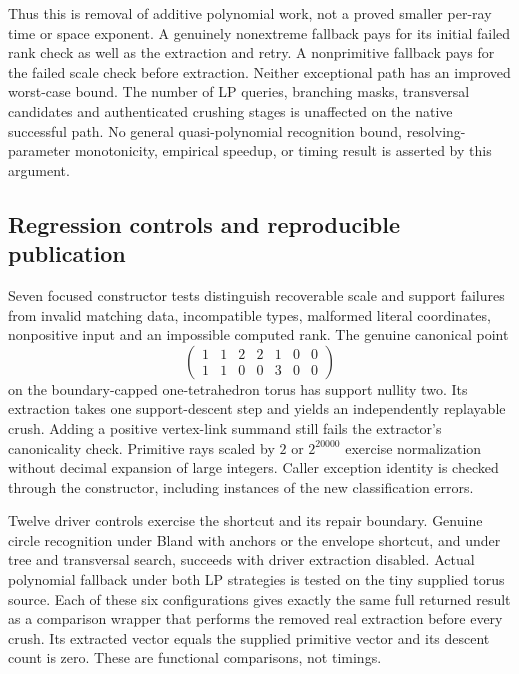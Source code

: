 Thus this is removal of additive polynomial work, not a proved smaller
per-ray time or space exponent.  A genuinely nonextreme fallback pays for
its initial failed rank check as well as the extraction and retry.  A
nonprimitive fallback pays for the failed scale check before extraction.
Neither exceptional path has an improved worst-case bound.  The number
of LP queries, branching masks, transversal candidates and authenticated
crushing stages is unaffected on the native successful path.  No general
quasi-polynomial recognition bound, resolving-parameter monotonicity,
empirical speedup, or timing result is asserted by this argument.

\subsection{Regression controls and reproducible publication}

Seven focused constructor tests distinguish recoverable scale and support
failures from invalid matching data, incompatible types, malformed literal
coordinates, nonpositive input and an impossible computed rank.  The genuine
canonical point
\[
 \begin{pmatrix}
 1&1&2&2&1&0&0\\
 1&1&0&0&3&0&0
 \end{pmatrix}
\]
on the boundary-capped one-tetrahedron torus has support nullity two.
Its extraction takes one support-descent step and yields an independently
replayable crush.  Adding a positive vertex-link summand still fails the
extractor's canonicality check.  Primitive rays scaled by $2$ or $2^{20000}$
exercise normalization without decimal expansion of large integers.
Caller exception identity is checked through the constructor, including
instances of the new classification errors.

Twelve driver controls exercise the shortcut and its repair boundary.
Genuine circle recognition under Bland with anchors or the envelope shortcut,
and under tree and transversal search, succeeds with driver extraction
disabled.  Actual polynomial fallback under both LP strategies is tested on the
tiny supplied torus source.  Each of these six configurations gives exactly
the same full returned result as a comparison wrapper that performs the
removed real extraction before every crush.  Its extracted vector equals
the supplied primitive vector and its descent count is zero.  These are
functional comparisons, not timings.

